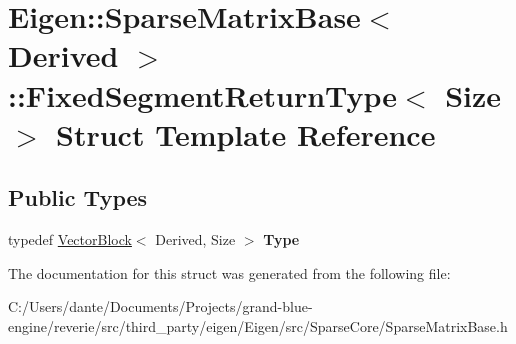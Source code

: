 \hypertarget{struct_eigen_1_1_sparse_matrix_base_1_1_fixed_segment_return_type}{}\section{Eigen\+::Sparse\+Matrix\+Base$<$ Derived $>$\+::Fixed\+Segment\+Return\+Type$<$ Size $>$ Struct Template Reference}
\label{struct_eigen_1_1_sparse_matrix_base_1_1_fixed_segment_return_type}
\subsection*{Public Types}
\begin{DoxyCompactItemize}
\item 
\mbox{\label{struct_eigen_1_1_sparse_matrix_base_1_1_fixed_segment_return_type_a7c77da2f9bb459d74527680fd89888b6}} 
typedef \mbox{\hyperlink{class_eigen_1_1_vector_block}{Vector\+Block}}$<$ Derived, Size $>$ {\bfseries Type}
\end{DoxyCompactItemize}


The documentation for this struct was generated from the following file\+:\begin{DoxyCompactItemize}
\item 
C\+:/\+Users/dante/\+Documents/\+Projects/grand-\/blue-\/engine/reverie/src/third\+\_\+party/eigen/\+Eigen/src/\+Sparse\+Core/Sparse\+Matrix\+Base.\+h\end{DoxyCompactItemize}
